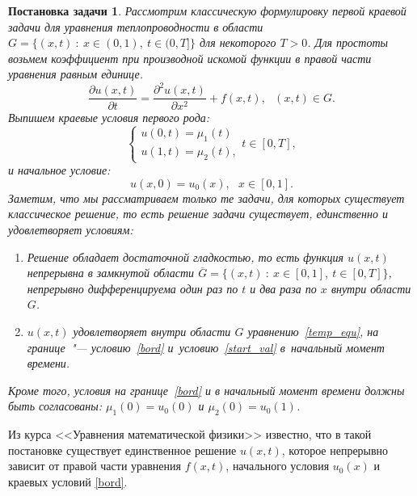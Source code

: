 \documentclass[11pt,a4paper,twoside]{report}
\numberwithin{equation}{section}
\theoremstyle{definition}
\theoremstyle{plain}
\newtheorem*{formulation*}{Постановка задачи}
\begin{document}
%
\begin{formulation*}
%
    Рассмотрим классическую формулировку первой краевой задачи для уравнения теплопроводности
    в области $G=\{(x, t)~:~x \in (0,1),~t\in (0,T]\}$ для некоторого $T>0$.
    Для простоты возьмем коэффициент при производной искомой функции
    в правой части уравнения равным единице.
    \begin{equation}
        \label{temp_equ}
        \frac{\partial u(x,t)}{\partial t} =
        \frac{\partial^2u(x,t)}{\partial x^2} + f(x,t),
        ~~~(x,t) \in G.
    \end{equation}
    Выпишем краевые условия первого рода:
    \begin{equation}
        \label{bord}
        \begin{cases}
            u(0,t) = \mu_1(t) \\
            u(1,t) = \mu_2(t),
        \end{cases}
        t\in [0,T],
    \end{equation}
    и начальное условие:
    \begin{equation}
        \label{start_val}
        u(x,0) = u_0(x),~~~x\in[0,1].
    \end{equation}
    Заметим, что мы рассматриваем только те задачи, для которых существует
    классическое решение, то есть решение задачи существует, единственно и
    удовлетворяет условиям:
    \begin{enumerate}
        \item Решение обладает достаточной гладкостью, то есть
            функция $u(x,t)$ непрерывна в замкнутой области
            $\overline{G} = \{(x,t)~:~x \in [0,1],~t\in [0,T]\}$, непрерывно
            дифференцируема один раз по $t$ и два раза по $x$ внутри области $G$.
        \item $u(x,t)$ удовлетворяет внутри области $G$ уравнению~\eqref{temp_equ},
            на границе~"--- условию~\eqref{bord} и~условию~\eqref{start_val}
            в~начальный момент времени.
    \end{enumerate}
    Кроме того, условия на границе~\eqref{bord} и в начальный момент времени
    должны быть согласованы: $\mu_1(0) = u_0(0)$ и $\mu_2(0) = u_0(1)$.
%
\end{formulation*}
%

Из курса <<Уравнения математической физики>> известно, что в такой постановке
существует единственное решение $u(x, t)$, которое непрерывно зависит от правой части
уравнения $f(x, t)$, начального условия $u_0(x)$ и краевых условий \eqref{bord}.
\end{document}
